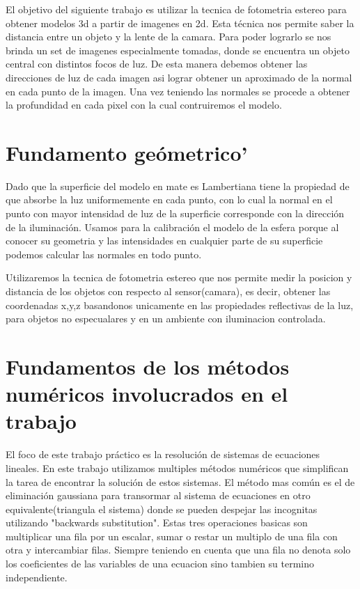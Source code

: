El objetivo del siguiente trabajo es utilizar la tecnica de fotometria estereo para obtener modelos 3d a partir de imagenes en 2d. Esta t\'ecnica nos permite saber la distancia entre un objeto y la lente de la camara. Para poder lograrlo se nos brinda un set de imagenes especialmente tomadas, donde se encuentra un objeto central con distintos focos de luz.
De esta manera debemos obtener las direcciones de luz de cada imagen asi lograr obtener un aproximado de la normal en cada punto de la imagen. Una vez teniendo las normales se procede a obtener la profundidad en cada pixel con la cual contruiremos el modelo.


\section{Fundamento ge\'ometrico'}
Dado que la superficie del modelo en mate es Lambertiana tiene la propiedad de que absorbe la luz uniformemente en cada punto, con lo cual la normal en el punto con mayor intensidad de luz de la superficie corresponde con la direcci\'on de la iluminaci\'on. Usamos para la calibraci\'on el modelo de la esfera porque al conocer su geometria y las intensidades en cualquier parte de su superficie podemos calcular las normales en todo punto.

Utilizaremos la tecnica de fotometria estereo que nos permite medir la posicion y distancia de los objetos con respecto al sensor(camara), es decir, obtener las coordenadas x,y,z basandonos unicamente en las propiedades reflectivas de la luz, para objetos no especualares y en un ambiente con iluminacion controlada.


\section{Fundamentos de los m\'etodos num\'ericos involucrados en el trabajo}


El foco de este trabajo pr\'actico es la resoluci\'on de sistemas de ecuaciones lineales.
En este trabajo utilizamos multiples m\'etodos num\'ericos que simplifican la tarea de encontrar la soluci\'on de estos sistemas. 
El m\'etodo mas com\'un es el de eliminaci\'on gaussiana para transormar al sistema de ecuaciones en otro equivalente(triangula el sistema) donde se pueden despejar las incognitas utilizando "backwards substitution". 
Estas tres operaciones basicas son multiplicar una fila por un escalar, sumar o restar un multiplo de una fila con otra y intercambiar filas. Siempre teniendo en cuenta que una fila no denota solo los coeficientes de las variables de una ecuacion sino tambien su termino independiente.




